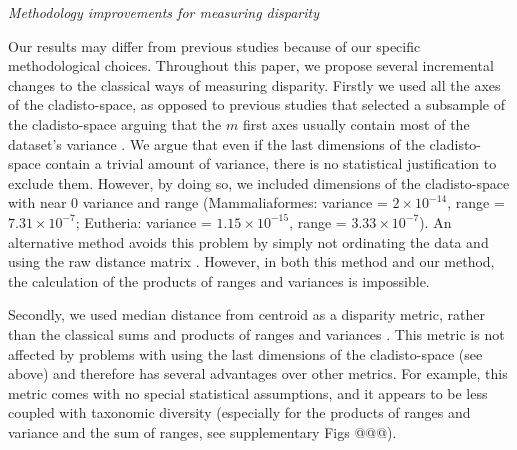 \documentclass[12pt,letterpaper]{article}
\renewcommand{\subsection}[1]{%
\bigskip
\begin{center}
\begin{large}
\normalfont\itshape #1
\end{large}
\end{center}}
\begin{document}
\subsection{Methodology improvements for measuring disparity}
Our results may differ from previous studies because of our specific methodological choices.
Throughout this paper, we propose several incremental changes to the classical ways of measuring disparity.
Firstly we used all the axes of the cladisto-space, as opposed to previous studies that selected a subsample of the cladisto-space arguing that the $m$ first axes usually contain most of the dataset's variance \citep[e.g][]{brusatte50,cisneros2010,prentice2011,anderson2012using,Hughes20082013,bentonmodels2014}.
We argue that even if the last dimensions of the cladisto-space contain a trivial amount of variance, there is no statistical justification to exclude them.
However, by doing so, we included dimensions of the cladisto-space with near $0$ variance and range (Mammaliaformes: variance = $2\times10^{-14}$, range = $7.31\times10^{-7}$; Eutheria: variance = $1.15\times10^{-15}$, range = $3.33\times10^{-7}$).
An alternative method avoids this problem by simply not ordinating the data and using the raw distance matrix \citep[e.g.][]{bensonfaunal2014,Close2015}. 
However, in both this method and our method, the calculation of the products of ranges and variances is impossible.

Secondly, we used median distance from centroid as a disparity metric, rather than the classical sums and products of ranges and variances \citep{Wills1994}.
This metric is not affected by problems with using the last dimensions of the cladisto-space (see above) and therefore has several advantages over other metrics. %
For example, this metric comes with no special statistical assumptions, and it appears to be less coupled with taxonomic diversity %
(especially for the products of ranges and variance and the sum of ranges, see supplementary Figs @@@).
\end{document}
